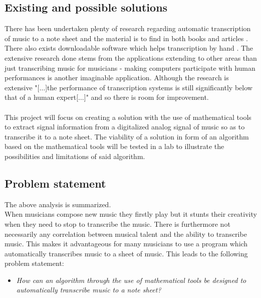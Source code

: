 \subsection{Existing and possible solutions}
There has been undertaken plenty of research regarding automatic transcription of music to a note sheet and the material is to find in both books \cite{sol1} and articles \cite{sol2}. There also exists downloadable software which helps transcription by hand \cite{transcribe!}. The extensive research done stems from the applications extending to other areas than just transcribing music for musicians - making computers participate with human performances is another imaginable application. Although the research is extensive "[$\hdots$]the performance of transcription systems is still significantly below that of a human expert[$\hdots$]" \cite{future} and so there is room for improvement.\\\\
This project will focus on creating a solution with the use of mathematical tools to extract signal information from a digitalized analog signal of music so as to transcribe it to a note sheet. The viability of a solution in form of an algorithm based on the mathematical tools will be tested in a lab to illustrate the possibilities and limitations of said algorithm. 
\subsection{Problem statement}
The above analysis is summarized.\\
When musicians compose new music they firstly play but it stunts their creativity when they need to stop to transcribe the music. There is furthermore not necessarily any correlation between musical talent and the ability to transcribe music. This makes it advantageous for many musicians to use a program which automatically transcribes music to a sheet of music. This leads to the following problem statement:
\begin{itemize}
\item[] \textit{How can an algorithm through the use of mathematical tools be designed to automatically transcribe music to a note sheet?}
\end{itemize}
